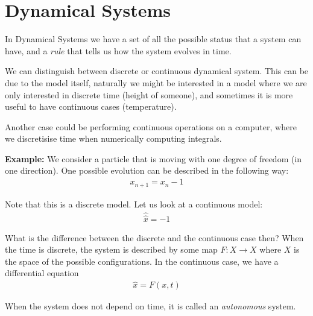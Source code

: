 \par\bigskip
\section{Dynamical Systems}\par
\noindent In Dynamical Systems we have a set of all the possible status that a system can have, and a \textit{rule}  that tells us how the system evolves in time.
\par\bigskip
\noindent We can distinguish between discrete or continuous dynamical system. This can be due to the model itself, naturally we might be interested in a model where we are only interested in discrete time (height of someone), and sometimes it is more useful to have continuous cases (temperature).
\par\bigskip
\noindent Another case could be performing continuous operations on a computer, where we discretisise time when numerically computing integrals.
\par\bigskip
\noindent\textbf{Example:} We consider a particle that is moving with one degree of freedom (in one direction). One possible evolution can be described in the following way:
\begin{equation*}
  \begin{gathered}
    x_{n+1} = x_n-1
  \end{gathered}
\end{equation*}\par
\noindent Note that this is a discrete model. Let us look at a continuous model:
\begin{equation*}
  \begin{gathered}
    \hat{\hat{x}} = -1
  \end{gathered}
\end{equation*}
\par\bigskip
\noindent What is the difference between the discrete and the continuous case then? When the time is discrete, the system is described by some map $F:X\to X$ where $X$ is the space of the possible configurations. In the continuous case, we have a differential equation
\begin{equation*}
  \begin{gathered}
    \hat{x} = F(x,t)
  \end{gathered}
\end{equation*}
\par\bigskip
\noindent When the system does not depend on time, it is called an \textit{autonomous}  system.
\par\bigskip
